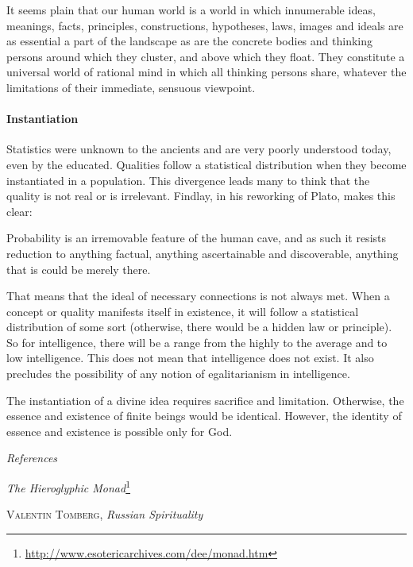\begin{quotex}
It seems plain that our human world is a world in which innumerable ideas, meanings, facts, principles, constructions, hypotheses, laws, images and ideals are as essential a part of the landscape as are the concrete bodies and thinking persons around which they cluster, and above which they float. They constitute a universal world of rational mind in which all thinking persons share, whatever the limitations of their immediate, sensuous viewpoint.
\end{quotex}


\paragraph{Instantiation}


Statistics were unknown to the ancients and are very poorly understood today, even by the educated. Qualities follow a statistical distribution when they become instantiated in a population. This divergence leads many to think that the quality is not real or is irrelevant. Findlay, in his reworking of Plato, makes this clear:

\begin{quotex}
Probability is an irremovable feature of the human cave, and as such it resists reduction to anything factual, anything ascertainable and discoverable, anything that is could be merely there.
\end{quotex}


That means that the ideal of necessary connections is not always met. When a concept or quality manifests itself in existence, it will follow a statistical distribution of some sort (otherwise, there would be a hidden law or principle). So for intelligence, there will be a range from the highly to the average and to low intelligence. This does not mean that intelligence does not exist. It also precludes the possibility of any notion of egalitarianism in intelligence.

The instantiation of a divine idea requires sacrifice and limitation. Otherwise, the essence and existence of finite beings would be identical. However, the identity of essence and existence is possible only for God.

\textit{References}

\textit{The Hieroglyphic Monad}\footnote{\url{http://www.esotericarchives.com/dee/monad.htm}}

\textsc{Valentin Tomberg}, \emph{Russian Spirituality}

